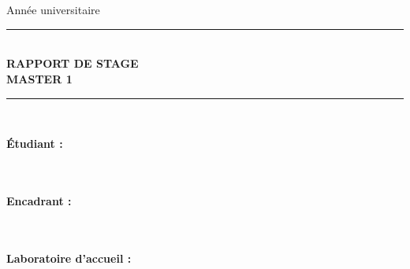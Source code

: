 
\thispagestyle{empty}

\begin{center}


\vspace{1cm}

{\Large \textbf{\university}}\\[0.5cm]
{\large \textbf{\program}}\\[0.5cm]
{\large Année universitaire \academicyear}

\vspace{2cm}

\rule{\linewidth}{0.5mm}\\[0.4cm]
{\huge \textbf{RAPPORT DE STAGE}}\\[0.4cm]
{\huge \textbf{MASTER 1}}\\[0.4cm]
\rule{\linewidth}{0.5mm}

\vspace{1.5cm}

{\Large \textbf{\internshiptitle}}\\[0.8cm]
{\large \internshipsubtitle}

\vspace{2cm}

\begin{minipage}[t]{0.45\textwidth}
    \textbf{Étudiant :}\\
    \studentname\\
    \studentnumber\\
    \studentemail
\end{minipage}
\hfill
\begin{minipage}[t]{0.45\textwidth}
    \textbf{Encadrant :}\\
    \supervisor\\
    \supervisortitle\\
    \supervisoremail
\end{minipage}

\vspace{2cm}

\textbf{Laboratoire d'accueil :}\\
{\large \laboratory}\\[0.3cm]
\laboratoryaddress

\vspace{1.5cm}


\vfill


\end{center}

\newpage
